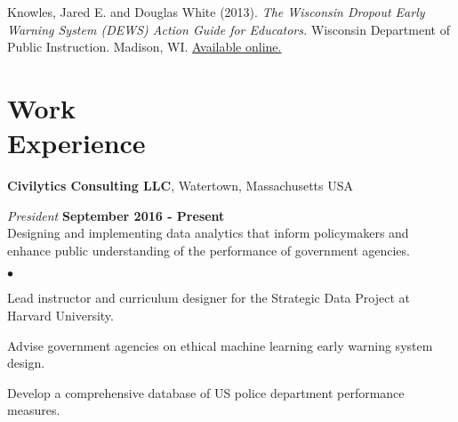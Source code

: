 \documentclass[margin,line]{res}
\newenvironment{list2}{
  \begin{list}{$\bullet$}{%
      \setlength{\itemsep}{0in}
      \setlength{\parsep}{0in} \setlength{\parskip}{0in}
      \setlength{\topsep}{0in} \setlength{\partopsep}{0in} 
      \setlength{\leftmargin}{0.2in}}}{\end{list}}
\begin{document}
\begin{resume}
Knowles, Jared E. and Douglas White (2013). \emph{The Wisconsin Dropout Early 
Warning System (DEWS) Action Guide for Educators.} Wisconsin Department of Public 
Instruction. Madison, WI. \href{http://dpi.wi.gov/dews}{Available online.}



% 
% 
% 

\vspace*{2.5mm}

\section{\sc Work \\ Experience}
{\bf Civilytics Consulting LLC}, Watertown, Massachusetts USA

\vspace{-.3cm}
{\em President} \hfill {\bf September 2016 - Present}\\
Designing and implementing data analytics that inform policymakers and enhance 
public understanding of the performance of government agencies.\\
\vspace{-2mm}
\begin{list2}
\item Lead instructor and curriculum designer for the Strategic Data Project at Harvard University.
\item Advise government agencies on ethical machine learning early warning system design. 
\item Develop a comprehensive database of US police department performance measures.
\end{list2}
\vspace{-.1cm}



\end{resume}
\end{document}
